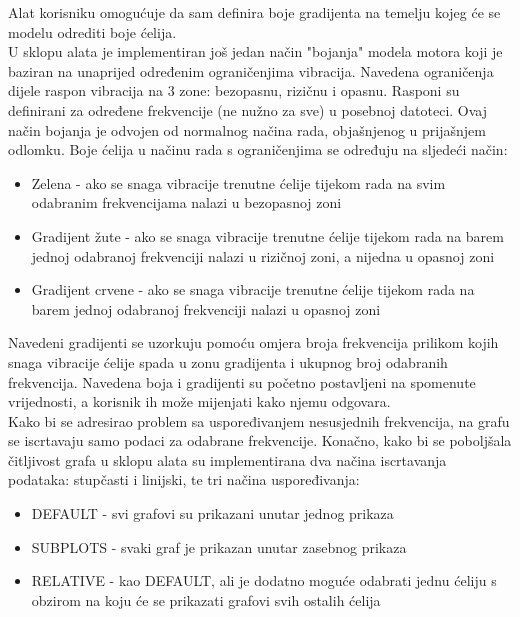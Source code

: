 \documentclass[times, utf8, diplomski]{fer}
\begin{document}
Alat korisniku omogućuje da sam definira boje gradijenta na temelju kojeg će se modelu odrediti boje ćelija.\\

U sklopu alata je implementiran još jedan način "bojanja" modela motora koji je baziran na unaprijed određenim ograničenjima vibracija. Navedena ograničenja dijele raspon vibracija na 3 zone: bezopasnu, rizičnu i opasnu. Rasponi su definirani za određene frekvencije (ne nužno za sve) u posebnoj datoteci. Ovaj način bojanja je odvojen od normalnog načina rada, objašnjenog u prijašnjem odlomku. Boje ćelija u načinu rada s ograničenjima se određuju na sljedeći način:
\begin{itemize}
\item Zelena - ako se snaga vibracije trenutne ćelije tijekom rada na svim odabranim frekvencijama nalazi u bezopasnoj zoni
\item Gradijent žute - ako se snaga vibracije trenutne ćelije tijekom rada na barem jednoj odabranoj frekvenciji nalazi u rizičnoj zoni, a nijedna u opasnoj zoni
\item Gradijent crvene - ako se snaga vibracije trenutne ćelije tijekom rada na barem jednoj odabranoj frekvenciji nalazi u opasnoj zoni\\
\end{itemize}

Navedeni gradijenti se uzorkuju pomoću omjera broja frekvencija prilikom kojih snaga vibracije ćelije spada u zonu gradijenta i ukupnog broj odabranih frekvencija. Navedena boja i gradijenti su početno postavljeni na spomenute vrijednosti, a korisnik ih može mijenjati kako njemu odgovara.\\

Kako bi se adresirao problem sa uspoređivanjem nesusjednih frekvencija, na grafu se iscrtavaju samo podaci za odabrane frekvencije. Konačno, kako bi se poboljšala čitljivost grafa u sklopu alata su implementirana dva načina iscrtavanja podataka: stupčasti i linijski, te tri načina uspoređivanja:
\begin{itemize}
\item DEFAULT - svi grafovi su prikazani unutar jednog prikaza
\item SUBPLOTS - svaki graf je prikazan unutar zasebnog prikaza
\item RELATIVE - kao DEFAULT, ali je dodatno moguće odabrati jednu ćeliju s obzirom na koju će se prikazati grafovi svih ostalih ćelija\\
\end{itemize}
\end{document}

